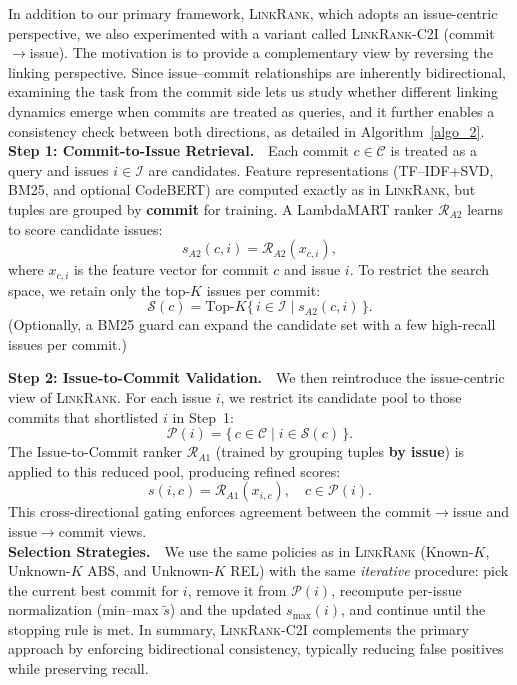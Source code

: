 In addition to our primary framework, \textsc{LinkRank}, which adopts an issue-centric perspective, we also experimented with a variant called \textsc{LinkRank-C2I} (commit$\rightarrow$issue). The motivation is to provide a complementary view by reversing the linking perspective. Since issue--commit relationships are inherently bidirectional, examining the task from the commit side lets us study whether different linking dynamics emerge when commits are treated as queries, and it further enables a consistency check between both directions, as detailed in Algorithm~\ref{algo_2}.\\

\noindent
\textbf{Step 1: Commit-to-Issue Retrieval.}\ \
Each commit $c \in \mathcal{C}$ is treated as a query and issues $i \in \mathcal{I}$ are candidates. Feature representations (TF--IDF+SVD, BM25, and optional CodeBERT) are computed exactly as in \textsc{LinkRank}, but tuples are grouped by \textbf{commit} for training. A LambdaMART ranker $\mathcal{R}_{A2}$ learns to score candidate issues:
\[
s_{A2}(c,i) = \mathcal{R}_{A2}(x_{c,i}),
\]
where $x_{c,i}$ is the feature vector for commit $c$ and issue $i$. To restrict the search space, we retain only the top-$K$ issues per commit:
\[
\mathcal{S}(c) = \mathrm{Top}\text{-}K \{\, i \in \mathcal{I} \mid s_{A2}(c,i) \,\}.
\]
(Optionally, a BM25 guard can expand the candidate set with a few high-recall issues per commit.)

\noindent
\textbf{Step 2: Issue-to-Commit Validation.}\ \
We then reintroduce the issue-centric view of \textsc{LinkRank}. For each issue $i$, we restrict its candidate pool to those commits that shortlisted $i$ in Step~1:
\[
\mathcal{P}(i) = \{\, c \in \mathcal{C} \mid i \in \mathcal{S}(c) \,\}.
\]
The Issue-to-Commit ranker $\mathcal{R}_{A1}$ (trained by grouping tuples \textbf{by issue}) is applied to this reduced pool, producing refined scores:
\[
s(i,c) = \mathcal{R}_{A1}(x_{i,c}), \quad c \in \mathcal{P}(i).
\]
This cross-directional gating enforces agreement between the commit$\rightarrow$issue and issue$\rightarrow$commit views.\\


\noindent
\textbf{Selection Strategies.}\ \
We use the same policies as in \textsc{LinkRank} (Known-$K$, Unknown-$K$ ABS, and Unknown-$K$ REL) with the same \emph{iterative} procedure: pick the current best commit for $i$, remove it from $\mathcal{P}(i)$, recompute per-issue normalization (min--max $\tilde{s}$) and the updated $s_{\max}(i)$, and continue until the stopping rule is met. In summary, \textsc{LinkRank-C2I} complements the primary approach by enforcing bidirectional consistency, typically reducing false positives while preserving recall.




